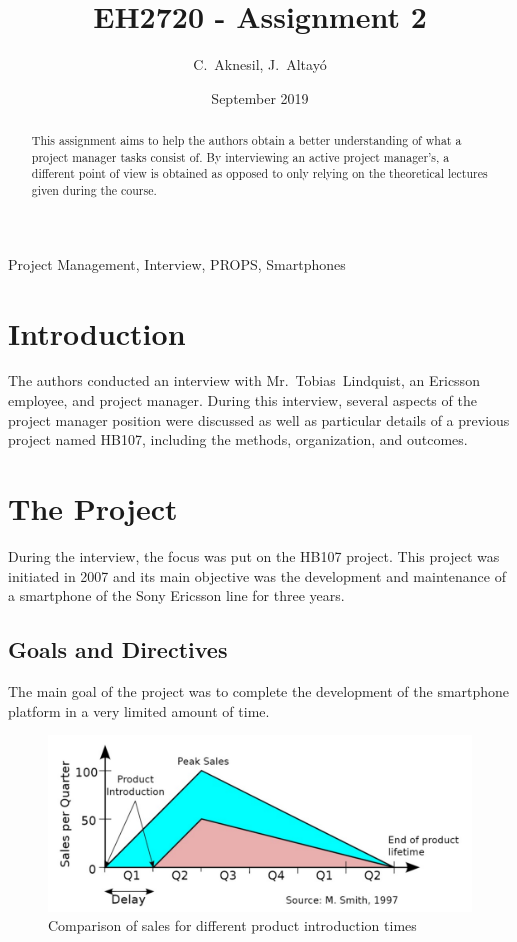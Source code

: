 \documentclass[journal]{IEEEtran}
\title{EH2720 - Assignment 2}
\author{C.~Aknesil, J.~Altayó}
\date{September 2019}
\begin{document}
\maketitle
\begin{abstract}
    This assignment aims to help the authors obtain a better understanding of what a project manager tasks consist of. By interviewing an active project manager's, a different point of view is obtained as opposed to only relying on the theoretical lectures given during the course.
\end{abstract}

\begin{IEEEkeywords}
    Project Management, Interview, PROPS, Smartphones
\end{IEEEkeywords}
\section{Introduction}
The authors conducted an interview with Mr.~Tobias~Lindquist, an Ericsson employee, and project manager. During this interview, several aspects of the project manager position were discussed as well as particular details of a previous project named HB107, including the methods, organization, and outcomes. 

\section{The Project}
During the interview, the focus was put on the HB107 project. This project was initiated in 2007 and its main objective was the development and maintenance of a smartphone of the Sony Ericsson line for three years.

\subsection{Goals and Directives}
The main goal of the project was to complete the development of the smartphone platform in a very limited amount of time. 

\begin{figure}[h]
    \centering
    \includegraphics[width=\linewidth]{sales.jpg}
    \caption{Comparison of sales for different product introduction times}
    \label{fig:sales}
\end{figure}
\end{document}
